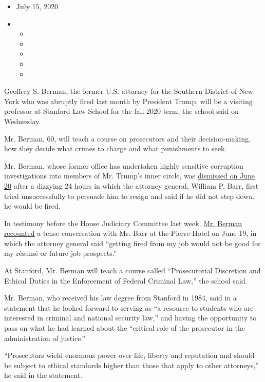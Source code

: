 \begin{itemize}
\item
  July 15, 2020
\item
  \begin{itemize}
  \item
  \item
  \item
  \item
  \item
  \end{itemize}
\end{itemize}

Geoffrey S. Berman, the former U.S. attorney for the Southern District
of New York who was abruptly fired last month by President Trump, will
be a visiting professor at Stanford Law School for the fall 2020 term,
the school said on Wednesday.

Mr. Berman, 60, will teach a course on prosecutors and their
decision-making, how they decide what crimes to charge and what
punishments to seek.

Mr. Berman, whose former office has undertaken highly sensitive
corruption investigations into members of Mr. Trump's inner circle, was
\href{https://www.nytimes3xbfgragh.onion/2020/06/20/nyregion/trump-geoffrey-berman-fired-sdny.html}{dismissed
on June 20} after a dizzying 24 hours in which the attorney general,
William P. Barr, first tried unsuccessfully to persuade him to resign
and said if he did not step down, he would be fired.

In testimony before the House Judiciary Committee last week,
\href{https://www.nytimes3xbfgragh.onion/2020/07/09/us/politics/top-manhattan-prosecutor-ousted-by-trump-details-firing.html}{Mr.
Berman recounted} a tense conversation with Mr. Barr at the Pierre Hotel
on June 19, in which the attorney general said ``getting fired from my
job would not be good for my résumé or future job prospects.''

At Stanford, Mr. Berman will teach a course called ``Prosecutorial
Discretion and Ethical Duties in the Enforcement of Federal Criminal
Law,'' the school said.

Mr. Berman, who received his law degree from Stanford in 1984, said in a
statement that he looked forward to serving as ``a resource to students
who are interested in criminal and national security law,'' and having
the opportunity to pass on what he had learned about the ``critical role
of the prosecutor in the administration of justice.''

``Prosecutors wield enormous power over life, liberty and reputation and
should be subject to ethical standards higher than those that apply to
other attorneys,'' he said in the statement.


